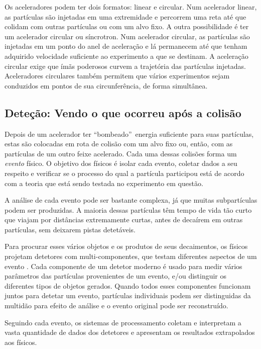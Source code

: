 Os aceleradores podem ter dois formatos: linear e
circular. Num acelerador linear, as partículas são
injetadas em uma extremidade e percorrem uma reta até que colidam com outras
partículas ou com um alvo fixo. A outra possibilidade é ter um acelerador
circular ou
síncrotron. Num acelerador circular, as partículas são injetadas em um ponto
do anel de aceleração e lá permanecem até que tenham adquirido velocidade
suficiente ao experimento a que se destinam. A aceleração circular exige que
ímãs poderosos curvem a trajetória das partículas injetadas. Aceleradores
circulares também permitem que vários experimentos sejam conduzidos em pontos
de sua circunferência, de forma simultânea.

\subsection{Deteção: Vendo o que ocorreu a\-pós a coli\-são}

Depois de um acelerador ter ``bombeado''\ energia suficiente para suas
par\-tí\-culas, estas são colocadas em rota de colisão com um alvo fixo ou,
então, com as partículas de um outro feixe acelerado. Cada uma dessas colisões
forma um \emph{evento} físico. O objetivo dos físicos é isolar cada evento,
coletar dados a seu respeito e verificar se o processo do qual a partícula
participou está de acordo com a teoria que está sendo testada no experimento
em questão.

A análise de cada evento pode ser bastante complexa, já que muitas
subpar\-tí\-cu\-las podem ser produzidas. A maioria dessas partículas têm
tempo de vida tão curto que viajam por distâncias extremamente curtas, antes
de decaírem em outras partículas, sem deixarem pistas detetáveis.

Para procurar esses vários objetos e os produtos de seus decaimentos, os
físicos projetam detetores com multi-componentes, que testam diferentes
aspectos de um evento \cite{d0, cms, atlas-tp, booth}. Cada componente de um
detetor moderno é usado para medir vários parâmetros das partículas
provenientes de um evento, e/ou distinguir os diferentes tipos de objetos
gerados.  Quando todos esses componentes funcionam juntos para detetar um
evento, partículas individuais podem ser distinguidas da multidão para efeito
de análise e o evento original pode ser reconstruído.

Seguindo cada evento, os sistemas de processamento coletam e interpretam a
vasta quantidade de dados dos detetores e apresentam os resultados extrapolados
aos físicos.


